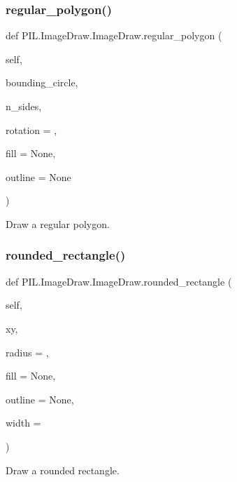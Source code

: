 \subsubsection{\texorpdfstring{regular\+\_\+polygon()}{regular\_polygon()}}
{\footnotesize\ttfamily def P\+I\+L.\+Image\+Draw.\+Image\+Draw.\+regular\+\_\+polygon (\begin{DoxyParamCaption}\item[{}]{self,  }\item[{}]{bounding\+\_\+circle,  }\item[{}]{n\+\_\+sides,  }\item[{}]{rotation = {},  }\item[{}]{fill = {\ttfamily None},  }\item[{}]{outline = {\ttfamily None} }\end{DoxyParamCaption})}

\begin{DoxyVerb}Draw a regular polygon.\end{DoxyVerb}
 \mbox{\label{classPIL_1_1ImageDraw_1_1ImageDraw_a6c7b6095263195d5d60e86124e122894}} 
\subsubsection{\texorpdfstring{rounded\+\_\+rectangle()}{rounded\_rectangle()}}
{\footnotesize\ttfamily def P\+I\+L.\+Image\+Draw.\+Image\+Draw.\+rounded\+\_\+rectangle (\begin{DoxyParamCaption}\item[{}]{self,  }\item[{}]{xy,  }\item[{}]{radius = {},  }\item[{}]{fill = {\ttfamily None},  }\item[{}]{outline = {\ttfamily None},  }\item[{}]{width = {} }\end{DoxyParamCaption})}

\begin{DoxyVerb}Draw a rounded rectangle.\end{DoxyVerb}
 \mbox{\label{classPIL_1_1ImageDraw_1_1ImageDraw_a342045083ba5ab5f39168b2b6fe61819}} 
